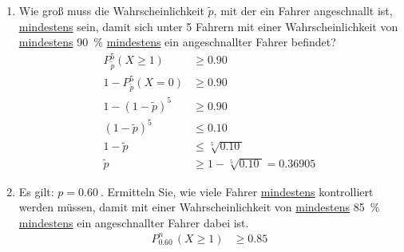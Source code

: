 \begin{Example}{}{}
\begin{enumerate}[label=\alph*),leftmargin=*]
{            \begin{align*}
                P\left(I\right) &= P_{\SI{0.60}{}}^{5} \left(2 \leq X \leq 4 \right)\\[1.5ex]
                &= P_{\SI{0.60}{}}^{5} \left(X = 2 \right) + P_{\SI{0.60}{}}^{5} \left(X = 3 \right) + P_{\SI{0.60}{}}^{5} \left(X = 4 \right) \\[1.5ex]
                &\overset{\text{TW}}{=} \SI{0.23040}{} + \SI{0.34560}{} + \SI{0.25920}{}\\[1.5ex]
                &= P_{\SI{0.60}{}}^{5} \left(X \leq 4 \right) - P_{\SI{0.60}{}}^{5} \left(X \leq 2 \right)\\[1.5ex]
                &\overset{\text{TW}}{=} \SI{0.9224}{} - \SI{0.08704}{}\\[1.0ex]
                &= \SI{0.83520}{}
            \end{align*}
            }
        \item[j)] {
            Wie groß muss die Wahrscheinlichkeit $\tilde{p}$, mit der ein Fahrer angeschnallt ist, \underline{mindestens} sein, damit sich unter 5 Fahrern mit einer Wahrscheinlichkeit von \underline{mindestens} \SI{90}{\percent} \underline{mindestens} ein angeschnallter Fahrer befindet?\\[-2.0ex]
            \begin{align*}
                P_{\tilde{p}}^{5} \left(X \geq 1\right) &\geq \SI{0.90}{}\\[1.5ex]
                1 - P_{\tilde{p}}^{5} \left(X = 0\right) &\geq \SI{0.90}{}\\[1.5ex]
                1 - (1-\tilde{p})^{5} &\geq \SI{0.90}{}\\[1.5ex]
                (1-\tilde{p})^{5} &\leq \SI{0.10}{}\\[1.5ex]
                1 - \tilde{p} &\leq \sqrt[5]{\SI{0.10}{}}\\[1.5ex]
                \tilde{p} &\geq 1 - \sqrt[5]{\SI{0.10}{}} = \SI{0.36905}{}
            \end{align*}
            }
        \item[k)] {
            Es gilt: $p = \SI{0.60}{}$. Ermitteln Sie, wie viele Fahrer \underline{mindestens} kontrolliert werden müssen, damit mit einer Wahrscheinlichkeit von \underline{mindestens} \SI{85}{\percent} \underline{mindestens} ein angeschnallter Fahrer dabei ist.\\[-2.0ex]
            \begin{align*}
                P_{\SI{0.60}{}}^{n} \left(X \geq 1\right) &\geq \SI{0.85}{}\\[1.5ex]

\end{align*}}
\end{enumerate}
\end{Example}
